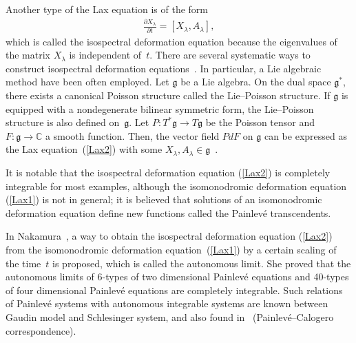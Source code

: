 \documentclass[10pt,a4paper]{amsart}
\numberwithin{equation}{section}
\begin{document}
Another type of the Lax equation is of the form
\begin{gather}
\frac{\partial X_\lambda }{\partial t} = [X_\lambda , A_\lambda ],\label{Lax2}
\end{gather}
which is called the isospectral deformation equation because the eigenvalues of the matrix $X_\lambda $ is independent of~$t$. There are several systematic ways to construct isospectral deformation equations~\cite{AMV}. In particular, a Lie algebraic method have been often employed. Let $\mathfrak{g}$ be a Lie algebra. On the dual space $\mathfrak{g}^*$, there exists a canonical Poisson structure called the Lie--Poisson structure. If $\mathfrak{g}$ is equipped with a nondegenerate bilinear symmetric form, the Lie--Poisson structure is also def\/ined on~$\mathfrak{g}$. Let $P \colon T^*\mathfrak{g} \to T\mathfrak{g}$ be the Poisson tensor and $F \colon \mathfrak{g} \to \mathbb{C}$ a smooth function. Then, the vector f\/ield $PdF$ on $\mathfrak{g}$ can be expressed as the Lax equation~(\ref{Lax2}) with some $X_\lambda , A_\lambda \in \mathfrak{g}$~\cite{AMV}.

It is notable that the isospectral deformation equation (\ref{Lax2}) is completely integrable for most examples, although the isomonodromic deformation equation (\ref{Lax1}) is not in general; it is believed that solutions of an isomonodromic deformation equation def\/ine new functions called the Painlev\'{e} transcendents.

In Nakamura~\cite{Nak}, a way to obtain the isospectral deformation equation (\ref{Lax2}) from the isomonodromic deformation equation~(\ref{Lax1}) by a certain scaling of the time~$t$ is proposed, which is called the autonomous limit. She proved that the autonomous limits of 6-types of two dimensional Painlev\'{e} equations and 40-types of four dimensional Painlev\'{e} equations are completely integrable. Such relations of Painlev\'{e} systems with autonomous integrable systems are known between Gaudin model and Schlesinger system, and also found in~\cite{LO} (Painlev\'{e}--Calogero correspondence).
\end{document}
